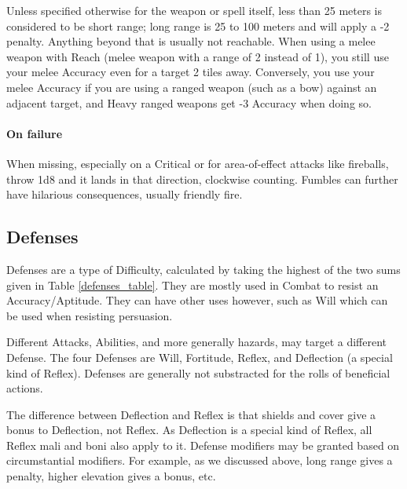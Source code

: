 Unless specified otherwise for the weapon or spell itself, less than 25 meters is considered to be short range; long range is 25 to 100 meters and will apply a -2 penalty. Anything beyond that is usually not reachable. When using a melee weapon with Reach (melee weapon with a range of 2 instead of 1), you still use your melee Accuracy even for a target 2 tiles away. Conversely, you use your melee Accuracy if you are using a ranged weapon (such as a bow) against an adjacent target, and Heavy ranged weapons get -3 Accuracy when doing so. 

\paragraph{On failure} 

When missing, especially on a Critical or for area-of-effect attacks like fireballs, throw 1d8 and it lands in that direction, clockwise counting. Fumbles can further have hilarious consequences, usually friendly fire.


\subsection{Defenses}
\label{defenses}

Defenses are a type of Difficulty, calculated by taking the highest of the two sums given in Table \ref{defenses_table}. They are mostly used in Combat to resist an Accuracy/Aptitude. They can have other uses however, such as Will which can be used when resisting persuasion. 

Different Attacks, Abilities, and more generally hazards, may target a different Defense. The four Defenses are Will, Fortitude, Reflex, and Deflection (a special kind of Reflex). Defenses are generally not substracted for the rolls of beneficial actions. 

The difference between Deflection and Reflex is that shields and cover give a bonus to Deflection, not Reflex. As Deflection is a special kind of Reflex, all Reflex mali and boni also apply to it. Defense modifiers may be granted based on circumstantial modifiers. For example, as we discussed above, long range gives a penalty, higher elevation gives a bonus, etc.

